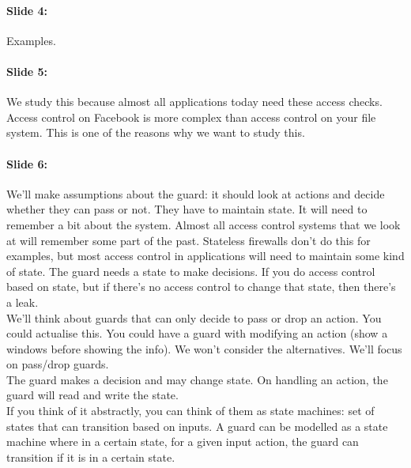 \documentclass[10pt,a4paper]{report}
\begin{document}
\paragraph{Slide 4:} Examples.

\paragraph{Slide 5:} We study this because almost all applications today need these access checks. Access control on Facebook is more complex than access control on your file system. This is one of the reasons why we want to study this.

\paragraph{Slide 6:} We'll make assumptions about the guard: it should look at actions and decide whether they can pass or not. They have to maintain state. It will need to remember a bit about the system. Almost all access control systems that we look at will remember some part of the past. Stateless firewalls don't do this for examples, but most access control in applications will need to maintain some kind of state. The guard needs a state to make decisions. If you do access control based on state, but if there's no access control to change that state, then there's a leak. \\
We'll think about guards that can only decide to pass or drop an action. You could actualise this. You could have a guard with modifying an action (show a windows before showing the info). We won't consider the alternatives. We'll focus on pass/drop guards.\\
The guard makes a decision and may change state. On handling an action, the guard will read and write the state.\\
If you think of it abstractly, you can think of them as state machines: set of states that can transition based on inputs. A guard can be modelled as a state machine where in a certain state, for a given input action, the guard can transition if it is in a certain state. 
\end{document}
